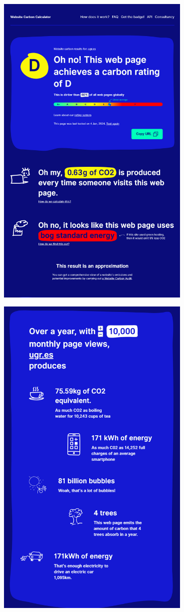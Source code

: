 \documentclass[12pt,a4paper]{report}
\begin{document}
\begin{center}
    \includegraphics[width=0.7\textwidth]{imagenes/WCC_2.png}
\end{center}

\begin{center}
    \includegraphics[width=0.7\textwidth]{imagenes/WCC_3.png}
\end{center}
\end{document}
